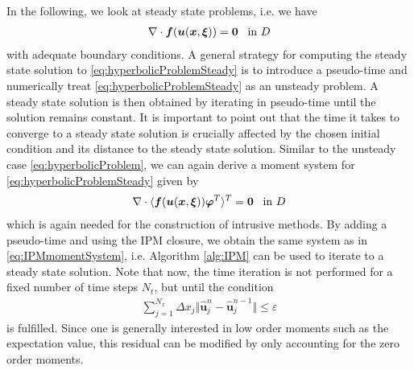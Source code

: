 In the following, we look at steady state problems, i.e. we have
\begin{align}\label{eq:hyperbolicProblemSteady}
\nabla\cdot\bm{f}(\bm{u}(\bm{x},\bm{\xi})) = \bm{0} \enskip \text{ in } D
\end{align}
with adequate boundary conditions. A general strategy for computing the steady state solution to \eqref{eq:hyperbolicProblemSteady} is to introduce a pseudo-time and numerically treat \eqref{eq:hyperbolicProblemSteady} as an unsteady problem. A steady state solution is then obtained by iterating in pseudo-time until the solution remains constant. It is important to point out that the time it takes to converge to a steady state solution is crucially affected by the chosen initial condition and its distance to the steady state solution.
Similar to the unsteady case \eqref{eq:hyperbolicProblem}, we can again derive a moment system for \eqref{eq:hyperbolicProblemSteady} given by
\begin{align}\label{eq:MomentSystemSteady}
\nabla\cdot\langle\bm{f}(\bm{u}(\bm{x},\bm{\xi}))\bm{\varphi}^T\rangle^T = \bm{0} \enskip \text{ in } D
\end{align}
which is again needed for the construction of intrusive methods. By adding a pseudo-time and using the IPM closure, we obtain the same system as in \eqref{eq:IPMmomentSystem}, i.e. Algorithm \ref{alg:IPM} can be used to iterate to a steady state solution. Note that now, the time iteration is not performed for a fixed number of time steps $N_t$, but until the condition
\begin{align}\label{eq:residualUnsteady}
\sum_{j = 1}^{N_x} \Delta x_j \Vert \bm{\hat{u}}_j^n - \bm{\hat{u}}_j^{n-1} \Vert \leq \varepsilon
\end{align}
is fulfilled. Since one is generally interested in low order moments such as the expectation value, this residual can be modified by only accounting for the zero order moments.

